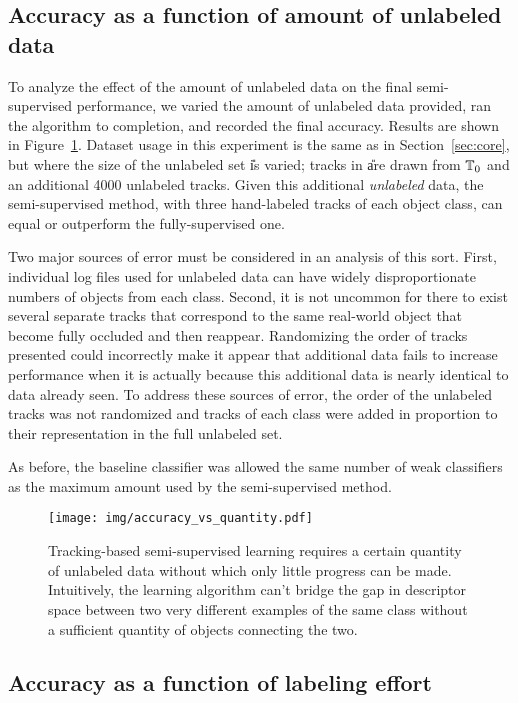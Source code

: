 \documentclass[conference]{IEEEtran}
\begin{document}
\subsection{Accuracy as a function of amount of unlabeled data}
\label{sec:quantity}

To analyze the effect of the amount of unlabeled data on the final semi-supervised performance, we varied the amount of unlabeled data provided, ran the algorithm to completion, and recorded the final accuracy.  Results are shown in Figure~\ref{fig:quantity}.  Dataset usage in this experiment is the same as in Section~\ref{sec:core}, but where the size of the unlabeled set \U is varied; tracks in \U are drawn from $\mathbb{T}_0$ and an additional 4000 unlabeled tracks.  Given this additional \textit{unlabeled} data, the semi-supervised method, with three hand-labeled tracks of each object class, can equal or outperform the fully-supervised one.

Two major sources of error must be considered in an analysis of this sort.  First, individual log files used for unlabeled data can have widely disproportionate numbers of objects from each class.  Second, it is not uncommon for there to exist several separate tracks that correspond to the same real-world object that become fully occluded and then reappear.  Randomizing the order of tracks presented could incorrectly make it appear that additional data fails to increase performance when it is actually because this additional data is nearly identical to data already seen.  To address these sources of error, the order of the unlabeled tracks was not randomized and tracks of each class were added in proportion to their representation in the full unlabeled set.

As before, the baseline classifier was allowed the same number of weak classifiers as the maximum amount used by the semi-supervised method.  
\begin{figure}
  \centering
  \texttt{[image: img/accuracy\_vs\_quantity.pdf]}
  \caption{Tracking-based semi-supervised learning requires a certain quantity of unlabeled data without which only little progress can be made.  Intuitively, the learning algorithm can't bridge the gap in descriptor space between two very different examples of the same class without a sufficient quantity of objects connecting the two.}
  \label{fig:quantity}
\end{figure}


\subsection{Accuracy as a function of labeling effort}
\label{sec:effort}
\end{document}
